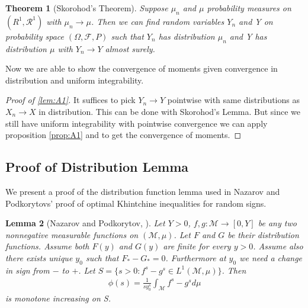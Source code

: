 \documentclass[10pt]{article}
\newcommand{\1}{\textbf{1}}
\newtheorem{theorem}{Theorem}[subsection]
\newtheorem{lemma}[theorem]{Lemma}
\theoremstyle{remark}
\theoremstyle{definition}
\begin{document}
\begin{theorem}[Skorohod's Theorem]\label{thm:A1}
	Suppose $\mu_n$ and $\mu$ probability measures on $(R^1,\mathcal{R}^1)$ with $\mu_n \to \mu$. Then we can find random variables $Y_n$ and Y on probability space $(\Omega,\mathcal{F},P)$ such that $Y_n$ has distribution $\mu_n$ and Y has distribution $\mu$ with $Y_n \to Y$ almost surely.
\end{theorem}

Now we are able to show the convergence of moments given convergence in distribution and uniform integrability.

\begin{proof}[Proof of \ref{lem:A1}]
	It suffices to pick $Y_n \to Y$ pointwise with same distributions as $X_n \to X$ in distribution. This can be done with Skorohod's Lemma. But since we still have uniform integrability with pointwise convergence we can apply proposition \ref{prop:A1} and to get the convergence of moments. 
\end{proof}

\subsection{Proof of Distribution Lemma}

We present a proof of the distribution function lemma used in Nazarov and Podkorytovs' proof of optimal Khintchine inequalities for random signs.

\begin{lemma}[Nazarov and Podkorytov, \cite{NP}]\label{lem:A.2.1}
	Let $Y > 0$, $f,g : \mathcal{M} \to [0,Y]$ be any two nonnegative measurable functions on $(\mathcal{M},\mu)$. Let $F$ and $G$ be their distribution functions. Assume both $F(y)$ and $G(y)$ are finite for every $y > 0$. Assume also  there exists unique $y_0$ such that $F_*-G_* = 0$. Furthermore at $y_0$ we need a change in sign from $-$ to $+$. Let $S = \{s > 0: f^s - g^s \in L^1(\mathcal{M},\mu)\}$. Then
	\begin{align*}
		\phi(s) = \frac{1}{sy_0^s}\int_{\mathcal{M}}f^s - g^s d\mu
	\end{align*}
	is monotone increasing on S. 
\end{lemma}
\end{document}
